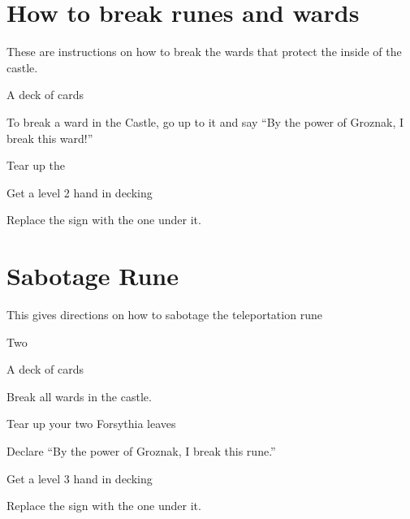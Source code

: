 \documentclass[green]{guildcamp2}
\begin{document}
\name{\gClericBreak{}}

\section{How to break runes and wards}
These are instructions on how to break the wards that protect the inside of the castle.

\begin{enum}[Requirements]
	\item \iHolyBook{}
	\item \iForsythia{}
	\item A deck of cards
\end{enum}
	
\begin{enum}[Directions]
	\item To break a ward in the Castle, go up to it and say "`By the power of Groznak, I break this ward!"'
	\item Tear up the \iForsythia{}
	\item Get a level 2 hand in decking
	\item Replace the sign with the one under it.
\end{enum}

\clearpage
\section{Sabotage Rune}
This gives directions on how to sabotage the teleportation rune

\begin{enum}[Requirements]
	\item Two \iForsythia{}
	\item \iHolyBook {}
	\item A deck of cards
\end{enum}

\begin{enum}[Directions]
	\item Break all wards in the castle.
	\item Tear up your two Forsythia leaves
	\item Declare "`By the power of Groznak, I break this rune."'
	\item Get a level 3 hand in decking
	\item Replace the sign with the one under it.
\end{enum}
	
\end{document}
